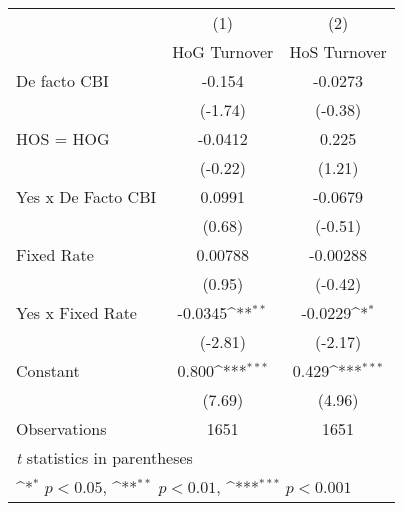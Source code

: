 \begin{table}[htbp]\centering
\def\sym#1{\ifmmode^{#1}\else\(^{#1}\)\fi}
\caption{\label{hoshogmultIndFEDF}}
\begin{tabular}{l*{2}{c}}
\toprule
                                        &\multicolumn{1}{c}{(1)}&\multicolumn{1}{c}{(2)}\\
                                        &\multicolumn{1}{c}{HoG Turnover}&\multicolumn{1}{c}{HoS Turnover}\\
\midrule
De facto CBI                            &   -0.154         &  -0.0273         \\
                                        &  (-1.74)         &  (-0.38)         \\
\addlinespace
HOS = HOG                               &  -0.0412         &    0.225         \\
                                        &  (-0.22)         &   (1.21)         \\
\addlinespace
Yes x De Facto CBI                      &   0.0991         &  -0.0679         \\
                                        &   (0.68)         &  (-0.51)         \\
\addlinespace
Fixed Rate                              &  0.00788         & -0.00288         \\
                                        &   (0.95)         &  (-0.42)         \\
\addlinespace
Yes x Fixed Rate                        &  -0.0345\sym{**} &  -0.0229\sym{*}  \\
                                        &  (-2.81)         &  (-2.17)         \\
\addlinespace
Constant                                &    0.800\sym{***}&    0.429\sym{***}\\
                                        &   (7.69)         &   (4.96)         \\
\midrule
Observations                            &     1651         &     1651         \\
\bottomrule
\multicolumn{3}{l}{\footnotesize \textit{t} statistics in parentheses}\\
\multicolumn{3}{l}{\footnotesize \sym{*} \(p<0.05\), \sym{**} \(p<0.01\), \sym{***} \(p<0.001\)}\\
\end{tabular}
\end{table}
